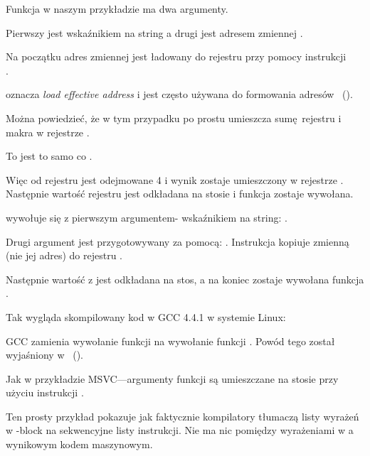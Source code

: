 Funkcja \scanf w naszym przykładzie ma dwa argumenty.

Pierwszy jest wskaźnikiem na string  a drugi jest adresem zmiennej .

Na początku adres zmiennej  jest ładowany do rejestru \EAX przy pomocy instrukcji \\
.

\LEA oznacza \emph{load effective address} i jest często używana do formowania adresów ~().

Można powiedzieć, że w tym przypadku \LEA po prostu umieszcza sumę rejestru \EBP i makra  w rejestrze \EAX.

To jest to samo co .

Więc od rejestru \EBP jest odejmowane 4 i wynik zostaje umieszczony w rejestrze \EAX.
Następnie wartość rejestru \EAX jest odkładana na stosie i funkcja \scanf zostaje wywołana.

\printf wywołuje się z pierwszym argumentem- wskaźnikiem na string:
.

Drugi argument jest przygotowywany za pomocą: .
Instrukcja kopiuje zmienną  (nie jej adres) do rejestru \ECX.

Następnie wartość z \ECX jest odkładana na stos, a na koniec zostaje wywołana funkcja  \printf.




Tak wygląda skompilowany kod w GCC 4.4.1 w systemie Linux:



GCC zamienia wywołanie funkcji \printf na wywołanie funkcji \puts. Powód tego został wyjaśniony w ~().

% 

Jak w przykładzie MSVC---argumenty funkcji są umieszczane na stosie przy użyciu instrukcji \MOV.


Ten prosty przykład pokazuje jak faktycznie kompilatory tłumaczą
listy wyrażeń w \CCpp-block na sekwencyjne listy instrukcji.
Nie ma nic pomiędzy wyrażeniami w \CCpp a wynikowym kodem maszynowym.
